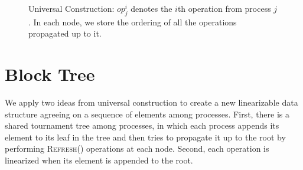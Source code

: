 \documentclass[10pt]{article}
\theoremstyle{definition}
\begin{document}
\begin{figure}[h]
\begin{center}
\caption{\label{fig::uc} Universal Construction: $op_j^i$ denotes the $i$th operation from process $j$. In each node, we store the ordering of all the operations propagated up to it.}
\end{center}
\end{figure}

\section{Block Tree}

We apply two ideas from universal construction to create a new linearizable data structure agreeing on a sequence of elements among processes. First, there is a shared tournament tree among processes, in which each process appends its element to its leaf in the tree and then tries to propagate it up to the root by performing \textsc{Refresh()} operations at each node. Second, each operation is linearized when its element is appended to the root.
\end{document}
